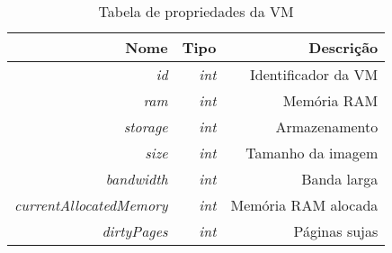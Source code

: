 \begin{table}[!htb]
    \centering
    \caption[Representação da VM]{Tabela de propriedades da VM
    \label{tab:constraint-shape}}
    \begin{tabular}{rrr}
        \toprule
            Nome & Tipo & Descrição \\ 
        \midrule
            \textit{id} & \textit{int} & Identificador da VM \\
            \textit{ram} & \textit{int} & Memória RAM \\
            \textit{storage} & \textit{int} & Armazenamento \\
            \textit{size} & \textit{int} & Tamanho da imagem \\
            \textit{bandwidth} & \textit{int} & Banda larga \\
            \textit{currentAllocatedMemory} & \textit{int} & Memória RAM alocada \\
            \textit{dirtyPages} & \textit{int} & Páginas sujas \\
        \bottomrule
    \end{tabular}
\end{table}


